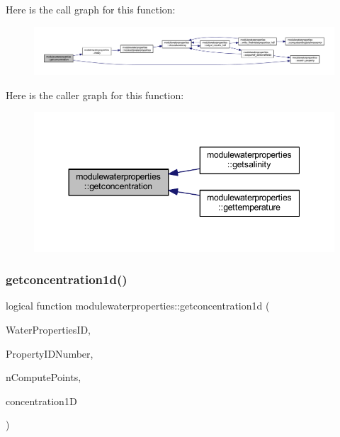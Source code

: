 Here is the call graph for this function\+:\nopagebreak
\begin{figure}[H]
\begin{center}
\leavevmode
\includegraphics[width=350pt]{namespacemodulewaterproperties_a45cbba90a6054db2070c49281da1ef56_cgraph}
\end{center}
\end{figure}
Here is the caller graph for this function\+:\nopagebreak
\begin{figure}[H]
\begin{center}
\leavevmode
\includegraphics[width=344pt]{namespacemodulewaterproperties_a45cbba90a6054db2070c49281da1ef56_icgraph}
\end{center}
\end{figure}
\mbox{\label{namespacemodulewaterproperties_a07e476dc922e05a1476e0df171c1bd25}} 
\subsubsection{\texorpdfstring{getconcentration1d()}{getconcentration1d()}}
{\footnotesize\ttfamily logical function modulewaterproperties\+::getconcentration1d (\begin{DoxyParamCaption}\item[{integer}]{Water\+Properties\+ID,  }\item[{integer}]{Property\+I\+D\+Number,  }\item[{integer}]{n\+Compute\+Points,  }\item[{real(8), dimension(ncomputepoints)}]{concentration1D }\end{DoxyParamCaption})\hspace{0.3cm}{\ttfamily [private]}}

